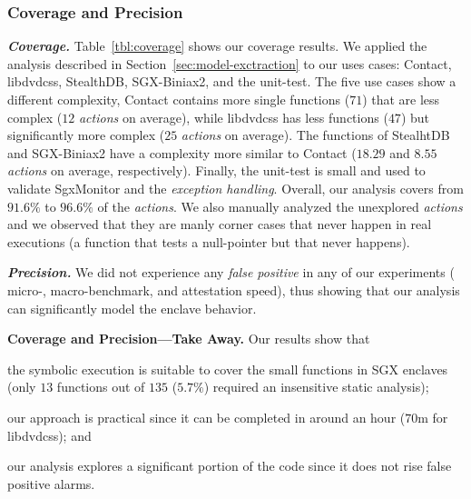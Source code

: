 \subsubsection{Coverage and Precision}
\label{sssec:coverage}

\emph{\textbf{Coverage.}}
Table~\ref{tbl:coverage} shows our coverage results. We applied the analysis 
described in Section~\ref{sec:model-exctraction} to our uses 
cases: \textsf{Contact}, \textsf{libdvdcss}, \textsf{StealthDB}, 
\textsf{SGX-Biniax2}, and the unit-test.
The five use cases show a different complexity, \textsf{Contact} contains more 
single functions ($71$) that are less complex ($12$ \emph{actions} on average), 
while \textsf{libdvdcss} has less functions ($47$) but significantly more 
complex ($25$ \emph{actions} on average).
The functions of \textsf{StealhtDB} and \textsf{SGX-Biniax2} have a 
complexity more similar to \textsf{Contact} ($18.29$ and $8.55$ \emph{actions} 
on average, respectively).
Finally, the unit-test is small and used to validate SgxMonitor and the 
\emph{exception handling}.
Overall, our analysis covers from $91.6\%$ to $96.6\%$ of the \emph{actions}.
We also manually analyzed the unexplored \emph{actions} and we observed that 
they are manly corner cases that never happen in real executions (\eg a 
function that tests a null-pointer but that never happens).

\emph{\textbf{Precision.}} 
We did not experience any \emph{false positive} in any of our experiments (\ie 
micro-, macro-benchmark, and attestation speed), thus showing that our analysis 
can significantly model the enclave behavior.

\vspace{0.5cm}
\noindent \textbf{Coverage and Precision---Take Away.} Our results show that 
\begin{enumerate*}[label=(\roman*)]
	\item the symbolic execution is suitable to cover the small	functions in 
	SGX enclaves (\ie only $13$ functions out of $135$ ($5.7\%$) required an 
	insensitive static analysis);
	\item our approach is practical since it can be completed in around an hour 
	(\ie $70$m for \textsf{libdvdcss}); and
	\item our analysis explores a significant portion of the code since it does 
	not rise false positive alarms.
\end{enumerate*}
%
%

